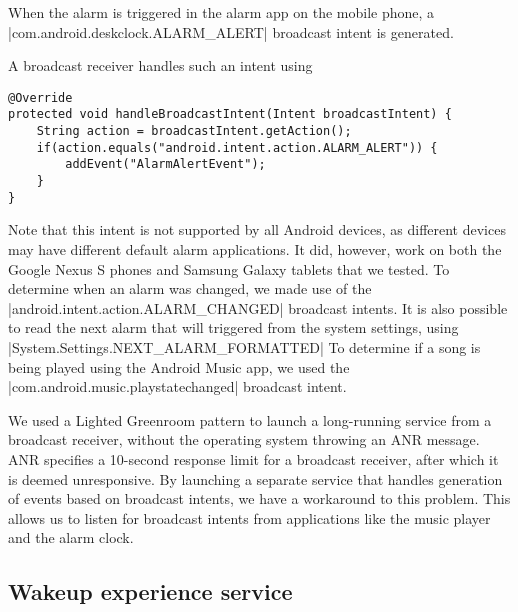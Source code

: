 When the alarm is triggered in the alarm app on the mobile phone, a |com.android.deskclock.ALARM_ALERT| broadcast intent is generated. 

A broadcast receiver handles such an intent using 

\begin{verbatim}
@Override
protected void handleBroadcastIntent(Intent broadcastIntent) {
	String action = broadcastIntent.getAction();
	if(action.equals("android.intent.action.ALARM_ALERT")) {
		addEvent("AlarmAlertEvent");
	}
}
\end{verbatim}
	
Note that this intent is not supported by all Android devices, as different devices may have different default alarm applications. It did, however, work on both the Google Nexus S phones and Samsung Galaxy tablets that we tested. To determine when an alarm was changed, we made use of the |android.intent.action.ALARM_CHANGED| broadcast intents. It is also possible to read the next alarm that will triggered from the system settings, using |System.Settings.NEXT_ALARM_FORMATTED| To determine if a song is being played using the Android Music app, we used the |com.android.music.playstatechanged| broadcast intent.

We used a Lighted Greenroom \cite{Komatineni2011} pattern to launch a long-running service from a broadcast receiver, without the operating system throwing an \ac{ANR} message. \ac{ANR} specifies a 10-second response limit for a broadcast receiver, after which it is deemed unresponsive. By launching a separate service that handles generation of events based on broadcast intents, we have a workaround to this problem. This allows us to listen for broadcast intents from applications like the music player and the alarm clock.

\subsection{Wakeup experience service}

